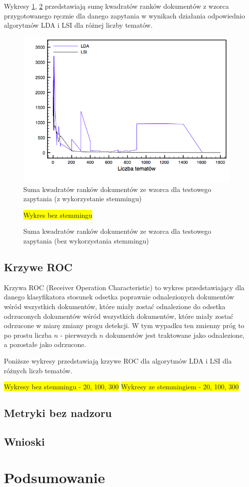 \documentclass[11pt,a4paper]{article}
\newcommand{\todo}[1]{\colorbox{yellow}{#1}}
\begin{document}
Wykresy \ref{ranks_stemming_comparison}, \ref{ranks_no_stemming_comparison}
przedstawiają sumę kwadratów ranków dokumentów z wzorca przygotowanego ręcznie
dla danego zapytania w wynikach działania odpowiednio algorytmów LDA i LSI dla
różnej liczby tematów.

\begin{figure}
\caption{Suma kwadratów ranków dokumentów ze wzorca dla testowego zapytania (z wykorzystanie stemmingu)}
\label{ranks_stemming_comparison}
\includegraphics[width=\linewidth]{gfx/ranks_stemming.png}
\end{figure}

\begin{figure}
\caption{Suma kwadratów ranków dokumentów ze wzorca dla testowego zapytania (bez wykorzystania stemmingu)}
\label{ranks_no_stemming_comparison}
\todo{Wykres bez stemmingu}
\end{figure}

\FloatBarrier

\subsection{Krzywe ROC}

Krzywa ROC (Receiver Operation Characteristic) to wykres przedstawiający dla
danego klasyfikatora stosunek odsetka poprawnie odnalezionych dokumentów wśród
wszystkich dokumentów, które miały zostać odnalezione do odsetka odrzuconych
dokumentów wśród wszystkich dokumentów, które miały zostać odrzucone w miarę
zmiany progu detekcji. W tym wypadku ten zmienny próg to po prostu liczba $n$ -
pierwszych $n$ dokumentów jest traktowane jako odnalezione, a pozostałe jako
odrzucone.

Poniższe wykresy przedstawiają krzywe ROC dla algorytmów LDA i LSI dla różnych
liczb tematów.

\todo{Wykresy bez stemmingu - 20, 100, 300}
\todo{Wykresy ze stemmingiem - 20, 100, 300}

\subsection{Metryki bez nadzoru}

\subsection{Wnioski}

\section{Podsumowanie}

\enddocument
\end{document}
